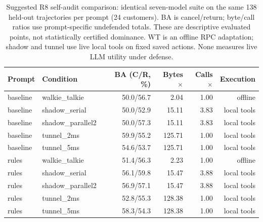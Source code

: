\begin{table}[t]\centering\footnotesize
\caption{Suggested R8 self-audit comparison: identical seven-model suite on the same 138 held-out trajectories per prompt (24 customers). BA is cancel/return; byte/call ratios use prompt-specific undefended totals. These are descriptive evaluated points, not statistically certified dominance. WT is an offline RPC adaptation; shadow and tunnel use live local tools on fixed saved actions. None measures live LLM utility under defense.}
\begin{tabular}{@{}llrrrr@{}}\toprule Prompt & Condition & BA (C/R, \%) & Bytes$\times$ & Calls$\times$ & Execution\\\midrule
baseline & walkie\_talkie & 50.0/56.7 & 2.04 & 1.00 & offline\\
baseline & shadow\_serial & 50.0/52.9 & 15.11 & 3.83 & local tools\\
baseline & shadow\_parallel2 & 50.0/57.3 & 15.11 & 3.83 & local tools\\
baseline & tunnel\_2ms & 59.9/55.2 & 125.71 & 1.00 & local tools\\
baseline & tunnel\_5ms & 54.6/53.7 & 125.71 & 1.00 & local tools\\
rules & walkie\_talkie & 51.4/56.3 & 2.23 & 1.00 & offline\\
rules & shadow\_serial & 56.1/59.8 & 15.47 & 3.88 & local tools\\
rules & shadow\_parallel2 & 56.9/57.1 & 15.47 & 3.88 & local tools\\
rules & tunnel\_2ms & 52.8/55.3 & 128.38 & 1.00 & local tools\\
rules & tunnel\_5ms & 58.3/54.3 & 128.38 & 1.00 & local tools\\
\bottomrule\end{tabular}
\end{table}
